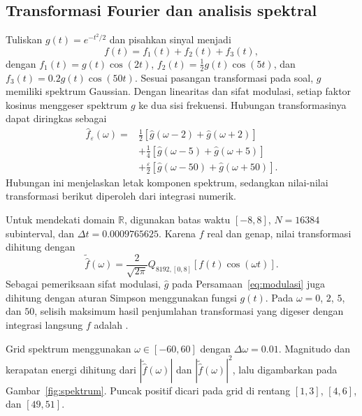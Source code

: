 \documentclass[11pt,a4paper]{article}
\begin{document}
\subsection{Transformasi Fourier dan analisis spektral}
Tuliskan $g(t)=e^{-t^2/2}$ dan pisahkan sinyal menjadi
\[
 f(t)=f_1(t)+f_2(t)+f_3(t),
\]
dengan $f_1(t)=g(t)\cos(2t)$, $f_2(t)=\tfrac12g(t)\cos(5t)$,
dan $f_3(t)=0.2g(t)\cos(50t)$. Sesuai pasangan transformasi pada soal,
$g$ memiliki spektrum Gaussian. Dengan linearitas dan sifat modulasi,
setiap faktor kosinus menggeser spektrum $g$ ke dua sisi frekuensi.
Hubungan transformasinya dapat diringkas sebagai
\begin{equation}
 \begin{aligned}
 \widehat f_\varepsilon(\omega)={}&
 \frac12[\widehat g(\omega-2)+\widehat g(\omega+2)]\\
 &+\frac14[\widehat g(\omega-5)+\widehat g(\omega+5)]\\
 &+\frac{\varepsilon}{2}[\widehat g(\omega-50)+\widehat g(\omega+50)].
 \end{aligned}
 \label{eq:modulasi}
\end{equation}
Hubungan ini menjelaskan letak komponen spektrum, sedangkan nilai-nilai
transformasi berikut diperoleh dari integrasi numerik.

Untuk mendekati domain $\mathbb R$, digunakan batas waktu $[-8,8]$,
$N=16384$ subinterval, dan $\Delta t=0.0009765625$.
Karena $f$ real dan genap, nilai transformasi dihitung dengan
\begin{equation}
 \widetilde{\widehat f}(\omega)=\frac2{\sqrt{2\pi}}
 Q_{8192,[0,8]}[f(t)\cos(\omega t)].
 \label{eq:transformasi-numerik}
\end{equation}
Sebagai pemeriksaan sifat modulasi, $\widehat g$ pada
Persamaan~\eqref{eq:modulasi} juga dihitung dengan aturan Simpson
menggunakan fungsi $g(t)$. Pada $\omega=0$, $2$, $5$, dan $50$,
selisih maksimum hasil penjumlahan transformasi yang digeser dengan
integrasi langsung $f$ adalah \GalatModulasi.

Grid spektrum menggunakan $\omega\in[-60,60]$ dengan
$\Delta\omega=0.01$. Magnitudo dan kerapatan energi dihitung dari
$|\widetilde{\widehat f}(\omega)|$ dan
$|\widetilde{\widehat f}(\omega)|^2$, lalu digambarkan pada
Gambar~\ref{fig:spektrum}. Puncak positif dicari pada grid di
rentang $[1,3]$, $[4,6]$, dan $[49,51]$.
\end{document}
